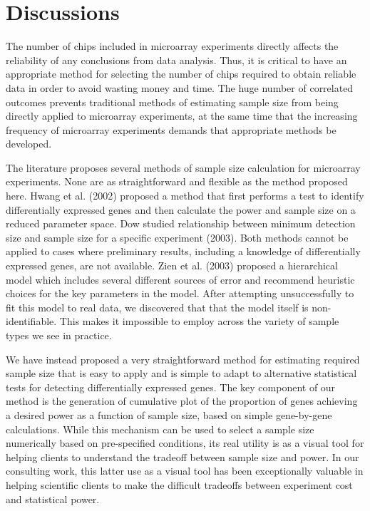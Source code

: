 \documentclass{bioinfo}
\begin{document}
\section{Discussions}

The number of chips included in microarray experiments directly
affects the reliability of any conclusions from data analysis.
Thus, it is critical to have an appropriate method for selecting the
number of chips required to obtain reliable data in order to avoid
wasting money and time. The huge number of correlated outcomes
prevents traditional methods of estimating sample size from being
directly applied to microarray experiments, at the same time that
the increasing frequency of microarray experiments demands that
appropriate methods be developed.

The literature proposes several methods of sample size calculation
for microarray experiments. None are as straightforward and flexible
as the method proposed here. Hwang et al. (2002) proposed a method
that first performs a test to identify differentially expressed
genes and then calculate the power and sample size on a reduced
parameter space. Dow studied relationship between minimum detection
size and sample size for a specific experiment (2003). Both methods
cannot be applied to cases where preliminary results, including a
knowledge of differentially expressed genes, are not available. Zien
et al.  (2003) proposed a hierarchical model which includes several
different sources of error and recommend heuristic choices for the
key parameters in the model.  After attempting unsuccessfully to fit
this model to real data, we discovered that that the model itself is
non-identifiable.  This makes it impossible to employ across the
variety of sample types we see in practice.

We have instead proposed a very straightforward method for
estimating required sample size that is easy to apply and is simple
to adapt to alternative statistical tests for detecting
differentially expressed genes. The key component of our method is
the generation of cumulative plot of the proportion of genes
achieving a desired power as a function of sample size, based on
simple gene-by-gene calculations.  While this mechanism can be used
to select a sample size numerically based on pre-specified
conditions, its real utility is as a visual tool for helping clients
to understand the tradeoff between sample size and power.  In our
consulting work, this latter use as a visual tool has been
exceptionally valuable in helping scientific clients to make the
difficult tradeoffs between experiment cost and statistical power.
\end{document}
